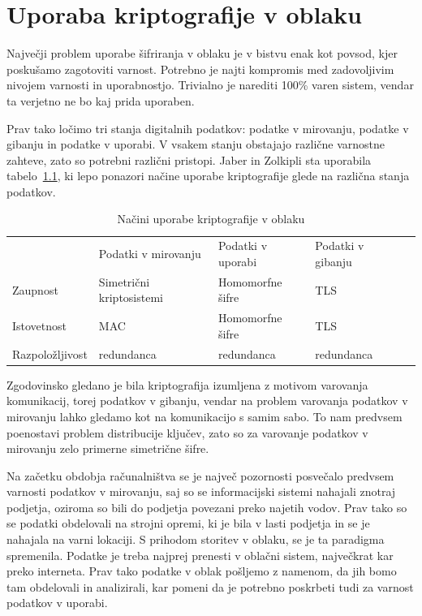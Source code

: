 \documentclass[12pt,a4paper,openany,tikz]{book}
\theoremstyle{plain}
\theoremstyle{definition}
\begin{document}
\chapter{Uporaba kriptografije v oblaku}
\label{chap:Uporaba kriptografije v oblaku}

Največji problem uporabe šifriranja v oblaku je v bistvu enak kot povsod, kjer poskušamo zagotoviti varnost. Potrebno je najti kompromis med zadovoljivim nivojem varnosti in uporabnostjo. Trivialno je narediti 100\% varen sistem, vendar ta verjetno ne bo kaj prida uporaben.

Prav tako ločimo tri stanja digitalnih podatkov: podatke v mirovanju, podatke v gibanju in podatke v uporabi. V vsakem stanju obstajajo različne varnostne zahteve, zato so potrebni različni pristopi. Jaber in Zolkipli\cite{jaber2013use} sta uporabila tabelo~\ref{tbl:cloudtriad}, ki lepo ponazori načine uporabe kriptografije glede na različna stanja podatkov.

\begin{table}[ht!]
  \centering
  \begin{tabular}{lllll}
                                        & Podatki v mirovanju                   & Podatki v uporabi                    & Podatki v gibanju              &  \\ \cline{2-4}
    \multicolumn{1}{l|}{Zaupnost}       & \multicolumn{1}{l|}{Simetrični kriptosistemi} & \multicolumn{1}{l|}{Homomorfne šifre} & \multicolumn{1}{l|}{TLS}        &  \\ \cline{2-4}
    \multicolumn{1}{l|}{Istovetnost}    & \multicolumn{1}{l|}{MAC}              & \multicolumn{1}{l|}{Homomorfne šifre} & \multicolumn{1}{l|}{TLS}        &  \\ \cline{2-4}
    \multicolumn{1}{l|}{Razpoložljivost} & \multicolumn{1}{l|}{redundanca}       & \multicolumn{1}{l|}{redundanca}       & \multicolumn{1}{l|}{redundanca} &  \\ \cline{2-4}
  \end{tabular}
  \caption{Načini uporabe kriptografije v oblaku}
\label{tbl:cloudtriad}
\end{table}

Zgodovinsko gledano je bila kriptografija izumljena z motivom varovanja komunikacij, torej podatkov v gibanju, vendar na problem varovanja podatkov v mirovanju lahko gledamo kot na komunikacijo s samim sabo. To nam predvsem poenostavi problem distribucije ključev, zato so za varovanje podatkov v mirovanju zelo primerne simetrične šifre.

Na začetku obdobja računalništva se je največ pozornosti posvečalo predvsem varnosti podatkov v mirovanju, saj so se informacijski sistemi nahajali znotraj podjetja, oziroma so bili do podjetja povezani preko najetih vodov. Prav tako so se podatki obdelovali na strojni opremi, ki je bila v lasti podjetja in se je nahajala na varni lokaciji. S prihodom storitev v oblaku, se je ta paradigma spremenila. Podatke je treba najprej prenesti v oblačni sistem, največkrat kar preko interneta. Prav tako podatke v oblak pošljemo z namenom, da jih bomo tam obdelovali in analizirali, kar pomeni da je potrebno poskrbeti tudi za varnost podatkov v uporabi.
\end{document}
